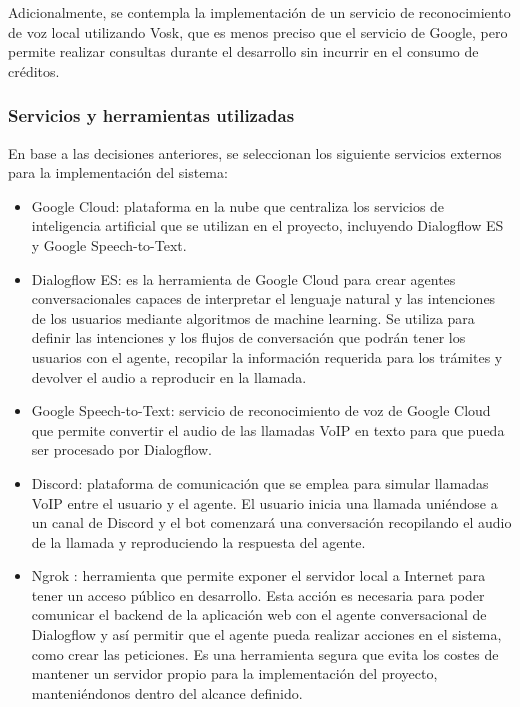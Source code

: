             Adicionalmente, se contempla la implementación de un servicio de reconocimiento de voz local utilizando Vosk, que es menos preciso que el servicio de Google, pero permite realizar consultas durante el desarrollo sin incurrir en el consumo de créditos. 

        \subsubsection{Servicios y herramientas utilizadas}
            En base a las decisiones anteriores, se seleccionan los siguiente servicios externos para la implementación del sistema:
            \begin{itemize}
                \item Google Cloud: plataforma en la nube que centraliza los servicios de inteligencia artificial que se utilizan en el proyecto, incluyendo Dialogflow ES y Google Speech-to-Text.
                \item Dialogflow ES: es la herramienta de Google Cloud para crear agentes conversacionales capaces de interpretar el lenguaje natural y las intenciones de los usuarios mediante algoritmos de machine learning. 
                    Se utiliza para definir las intenciones y los flujos de conversación que podrán tener los usuarios con el agente, recopilar la información requerida para los trámites y devolver el audio a reproducir en la llamada. 
                \item Google Speech-to-Text: servicio de reconocimiento de voz de Google Cloud que permite convertir el audio de las llamadas VoIP en texto para que pueda ser procesado por Dialogflow. 
                \item Discord: plataforma de comunicación que se emplea para simular llamadas VoIP entre el usuario y el agente. 
                    El usuario inicia una llamada uniéndose a un canal de Discord y el bot comenzará una conversación recopilando el audio de la llamada y reproduciendo la respuesta del agente. 
                \item Ngrok \cite{ref11}: herramienta que permite exponer el servidor local a Internet para tener un acceso público en desarrollo. 
                    Esta acción es necesaria para poder comunicar el backend de la aplicación web con el agente conversacional de Dialogflow y así permitir que el agente pueda realizar acciones en el sistema, como crear las peticiones. 
                    Es una herramienta segura que evita los costes de mantener un servidor propio para la implementación del proyecto, manteniéndonos dentro del alcance definido.
            \end{itemize}
    
